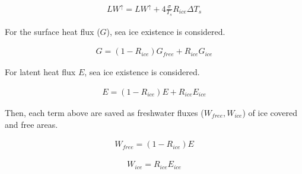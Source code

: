 \begin{eqnarray}
    LW^\uparrow=LW^\uparrow +  4\frac{\sigma}{T_s}R_{ice}  \Delta T_s
\end{eqnarray}

For the surface heat flux (\(G\)), sea ice existence is considered.

\begin{eqnarray}
    G=(1-R_{ice})G_{free} + R_{ice}G_{ice}
\end{eqnarray}

For latent heat flux \(E\), sea ice existence is considered.

\begin{eqnarray}
    E=(1-R_{ice})E + R_{ice}E_{ice}
\end{eqnarray}

Then, each term above are saved as freshwater fluxes (\(W_{free}, W_{ice}\)) of ice covered and free areas.

\begin{eqnarray}
    W_{free} = (1-R_{ice}) E
\end{eqnarray}

\begin{eqnarray}
    W_{ice} = R_{ice} E_{ice}
\end{eqnarray}
